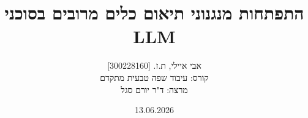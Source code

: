 \title{התפתחות מנגנוני תיאום כלים מרובים בסוכני \textenglish{LLM}}
\author{אבי איילי, ת.ז. [\textenglish{300228160}] \\ קורס: עיבוד שפה טבעית מתקדם \\ מרצה: ד"ר יורם סגל}
\date{\textenglish{13.06.2026}}

